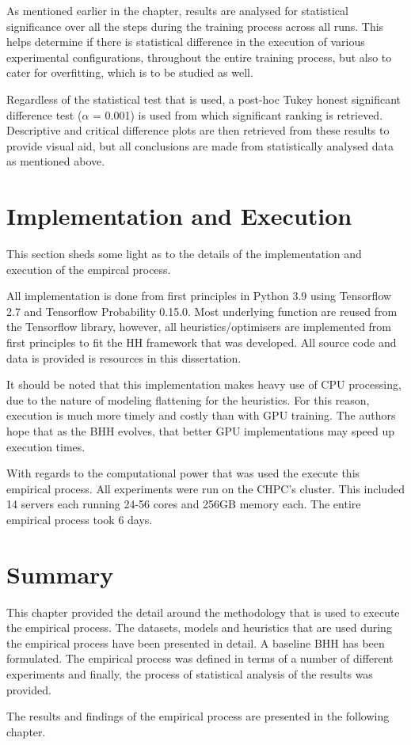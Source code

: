 As mentioned earlier in the chapter, results are analysed for statistical significance over all the steps during the training process across all runs. This helps determine if there is statistical difference in the execution of various experimental configurations, throughout the entire training process, but also to cater for overfitting, which is to be studied as well.

Regardless of the statistical test that is used, a post-hoc Tukey honest significant difference test ($\alpha$ = 0.001) is used from which significant ranking is retrieved. Descriptive and critical difference plots are then retrieved from these results to provide visual aid, but all conclusions are made from statistically analysed data as mentioned above.

\section{Implementation and Execution}
\label{sec:methodology:implementation}

This section sheds some light as to the details of the implementation and execution of the empircal process. 

All implementation is done from first principles in Python 3.9 using Tensorflow 2.7 and Tensorflow Probability 0.15.0. Most underlying function are reused from the Tensorflow library, however, all heuristics/optimisers are implemented from first principles to fit the \ac{HH} framework that was developed. All source code and data is provided is resources in this dissertation.

It should be noted that this implementation makes heavy use of CPU processing, due to the nature of modeling flattening for the heuristics. For this reason, execution is much more timely and costly than with GPU training. The authors hope that as the \ac{BHH} evolves, that better GPU implementations may speed up execution times. 

With regards to the computational power that was used the execute this empirical process. All experiments were run on the CHPC's cluster. This included 14 servers each running 24-56 cores and 256GB memory each. The entire empirical process took 6 days.

\section{Summary}
\label{sec:methodology:summary}

This chapter provided the detail around the methodology that is used to execute the empirical process. The datasets, models and heuristics that are used during the empirical process have been presented in detail. A baseline \ac{BHH} has been formulated. The empirical process was defined in terms of a number of different experiments and finally, the process of statistical analysis of the results was provided.

The results and findings of the empirical process are presented in the following chapter.
